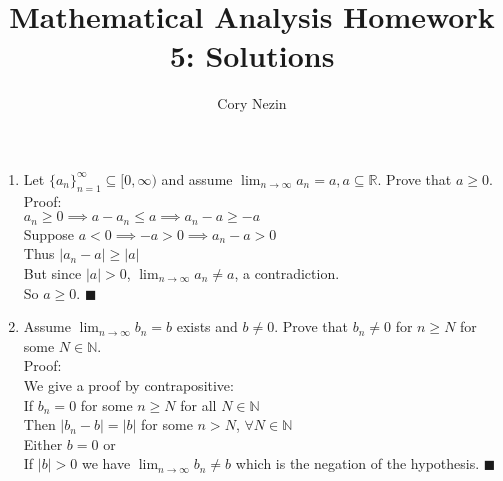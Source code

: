 \documentclass[12pt]{article}
\title{Mathematical Analysis Homework 5: Solutions}
\author{Cory Nezin}
\begin{document}
\maketitle
\begin{enumerate}
\item Let $\{a_n\}_{n=1}^\infty \subseteq [0,\infty)$ and assume $\lim_{n\to\infty}a_n = a, a\subseteq \mathbb{R}$.  Prove that $a\geq 0$.\\
Proof:\\
$a_n\geq 0 \implies a-a_n \leq a \implies a_n-a\geq -a$\\
Suppose $a<0 \implies -a > 0 \implies a_n - a > 0$\\
Thus $|a_n-a| \geq |a|$\\
But since $|a|>0$, $\lim_{n\to\infty}a_n \neq a$, a contradiction.\\
So $a \geq 0$. $\blacksquare$\\
\item Assume $\lim_{n\to\infty}b_n=b$ exists and $b \neq 0$.  Prove that $b_n \neq 0$ for $n\geq N$ for some $N\in\mathbb{N}$.\\
Proof:\\
We give a proof by contrapositive:\\
If $b_n = 0$ for some $n\geq N$ for all $N\in\mathbb{N}$\\
Then $|b_n-b| = |b|$ for some $n>N$, $\forall N\in\mathbb{N}$\\
Either $b = 0$ or\\
If $|b| > 0$ we have $\lim_{n\to\infty}b_n \neq b$ which is the negation of the hypothesis. $\blacksquare$
\end{enumerate}
\end{document}
